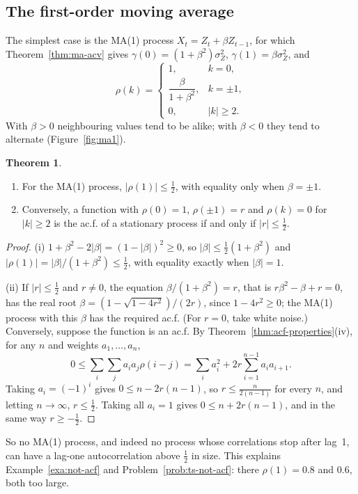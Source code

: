 \documentclass[11pt,a4paper]{article}
\theoremstyle{definition}
\newtheorem{thm}{Theorem}[subsection]
\begin{document}
\subsection{The first-order moving average}
The simplest case is the MA(1) process $X_t = Z_t + \beta Z_{t-1}$, for which Theorem~\ref{thm:ma-acv} gives $\gamma(0) = (1 + \beta^2)\sigma_Z^2$,
$\gamma(1) = \beta\sigma_Z^2$, and
\[
\rho(k) = \begin{cases} 1 , & k = 0 , \\ \dfrac{\beta}{1 + \beta^2} , & k = \pm1 , \\ 0 , & |k| \ge 2 . \end{cases}
\]
With $\beta > 0$ neighbouring values tend to be alike; with $\beta < 0$ they tend to alternate (Figure~\ref{fig:ma1}).

\begin{thm}\label{thm:ma1-bound}
\begin{enumerate}[label=(\roman*)]
\item For the MA(1) process, $|\rho(1)| \le \frac12$, with equality only when $\beta = \pm1$.
\item Conversely, a function with $\rho(0) = 1$, $\rho(\pm1) = r$ and $\rho(k) = 0$ for $|k| \ge 2$ is the ac.f. of a stationary process if and only if
$|r| \le \frac12$.
\end{enumerate}
\end{thm}

\begin{proof}
(i) $1 + \beta^2 - 2|\beta| = (1 - |\beta|)^2 \ge 0$, so $|\beta| \le \frac12(1 + \beta^2)$ and $|\rho(1)| = |\beta|/(1 + \beta^2) \le \frac12$, with equality exactly when $|\beta| = 1$.

(ii) If $|r| \le \frac12$ and $r \ne 0$, the equation $\beta/(1 + \beta^2) = r$, that is $r\beta^2 - \beta + r = 0$, has the real root
$\beta = (1 - \sqrt{1 - 4r^2})/(2r)$, since $1 - 4r^2 \ge 0$; the MA(1) process with this $\beta$ has the required ac.f. (For $r = 0$, take white
noise.) Conversely, suppose the function is an ac.f. By Theorem~\ref{thm:acf-properties}(iv), for any $n$ and weights $a_1, \dots, a_n$,
\[
0 \le \sum_i\sum_ja_ia_j\rho(i - j) = \sum_ia_i^2 + 2r\sum_{i=1}^{n-1}a_ia_{i+1} .
\]
Taking $a_i = (-1)^i$ gives $0 \le n - 2r(n - 1)$, so $r \le \frac{n}{2(n - 1)}$ for every $n$, and letting $n \to \infty$, $r \le \frac12$. Taking all $a_i = 1$ gives
$0 \le n + 2r(n - 1)$, and in the same way $r \ge -\frac12$.
\end{proof}

So no MA(1) process, and indeed no process whose correlations stop after lag~1, can have a lag-one
autocorrelation above $\frac12$ in size. This explains Example~\ref{exa:not-acf} and Problem~\ref{prob:ts-not-acf}: there $\rho(1) = 0.8$ and
$0.6$, both too large.
\end{document}

